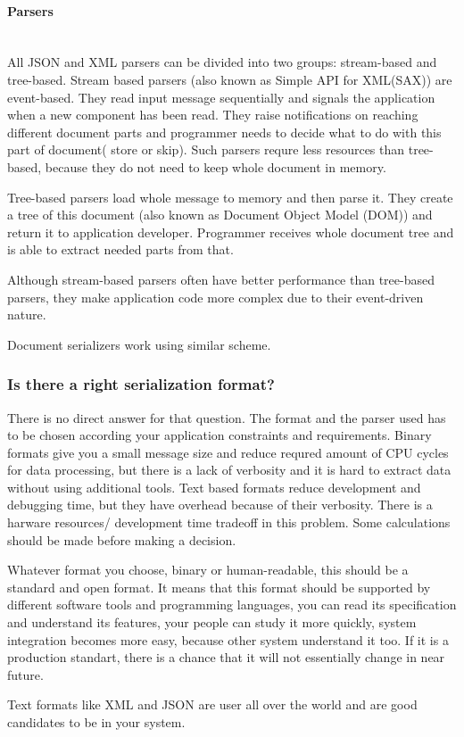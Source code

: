 \paragraph{Parsers} ~\\
All JSON and XML parsers can be divided into two groups: stream-based and
tree-based. Stream based parsers (also known as Simple API for XML(SAX)) are
event-based. They read input message sequentially and signals the application when a new component has
been read. They raise notifications on reaching different document parts and
programmer needs to decide what to do with this part of document( store or
skip). Such parsers requre less resources than tree-based, because they do not
need to keep whole document in memory.

Tree-based parsers load whole message to memory and then parse it. They create a
tree of this document (also known as Document Object Model (DOM)) and return it
to application developer. Programmer receives whole document tree and is able to
extract needed parts from that.

Although stream-based parsers often
have better performance than tree-based parsers, they make application code more
complex due to their event-driven nature.

Document serializers work using similar scheme.

\subsubsection{Is there a right serialization format?}

There is no direct answer for that question.
The format and the parser used has to be chosen according your application
constraints and requirements. Binary formats give you a small message size and
reduce requred amount of CPU cycles for data processing, but there is a lack of
verbosity and it is hard to extract data without using additional tools. Text
based formats reduce development and debugging time, but they have overhead
because of their verbosity. There is a harware resources/ development
time tradeoff in this problem. Some calculations should be made before making a
decision.

Whatever format you choose, binary or human-readable, this should be  a
standard and open format.
It means that this format should be supported by different software tools and programming
languages,  you can read its specification and understand its features, your
people can study it more quickly, system integration becomes more easy, because
other system understand it too. If it is a production standart, there is a
chance that it will not essentially change in near future.

Text formats like XML and JSON are user all over the world and are good
candidates to be in your system.




